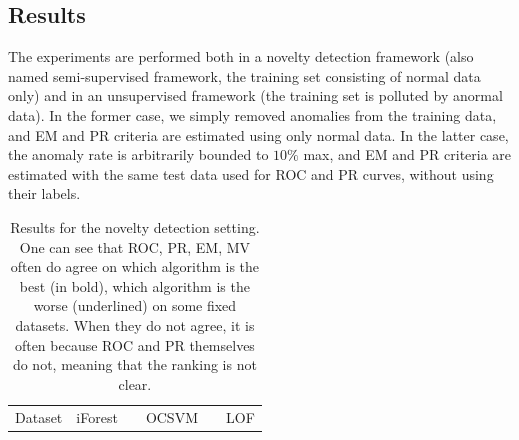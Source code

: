 \subsection{Results}

The experiments are performed both in a novelty detection framework (also named semi-supervised framework, the training set consisting of normal data only) and in an unsupervised framework (the training set is polluted by anormal data).
In the former case, we simply removed anomalies from the training data, and EM and PR criteria are estimated using only normal data.
In the latter case, the anomaly rate is arbitrarily bounded to $10\%$ max, and EM and PR criteria are estimated with the same test data used for ROC and PR curves, without using their labels.

\begin{table}[!ht]
\centering
\caption{Results for the novelty detection setting. One can see that ROC, PR, EM, MV often do agree on which algorithm is the best (in bold), which algorithm is the worse (underlined) on some fixed datasets. When they do not agree, it is often because ROC and PR themselves do not, meaning that the ranking is not clear.}
\label{evaluation:table:results-semisupervised}
\footnotesize
\tabcolsep=0.11cm
\resizebox{\linewidth}{!} {
\begin{tabular}{l cccc c cccc c cccc}
\toprule
Dataset      & \multicolumn{4}{c}{iForest}& & \multicolumn{4}{c}{OCSVM}&  & \multicolumn{4}{c}{LOF} \\ %
  \cmidrule{1-15}


\end{tabular}}
\end{table}
